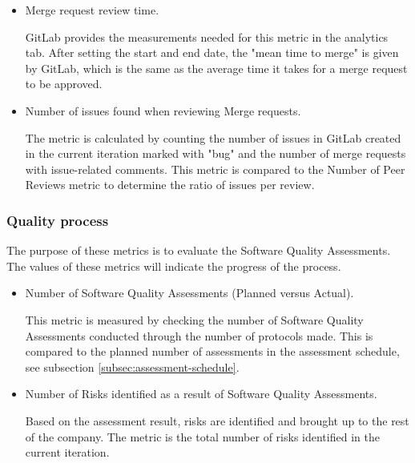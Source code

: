\begin{itemize}
    \item Merge request review time.
    
    GitLab provides the measurements needed for this metric in the analytics tab. After setting the start and end date, the "mean time to merge" is given by GitLab, which is the same as the average time it takes for a merge request to be approved. 
    
    \item Number of issues found when reviewing Merge requests.
    
    The metric is calculated by counting the number of issues in GitLab created in the current iteration marked with "bug" and the number of merge requests with issue-related comments. This metric is compared to the Number of Peer Reviews metric to determine the ratio of issues per review.
\end{itemize}


\subsubsection{Quality process}
The purpose of these metrics is to evaluate the Software Quality Assessments. The values of these metrics will indicate the progress of the process.

\begin{itemize}    
    \item Number of Software Quality Assessments (Planned versus Actual).
    
    This metric is measured by checking the number of Software Quality Assessments conducted through the number of protocols made. This is compared to the planned number of assessments in the assessment schedule, see subsection \ref{subsec:assessment-schedule}. 
     
    \item Number of Risks identified as a result of Software Quality Assessments.
    
    Based on the assessment result, risks are identified and brought up to the rest of the company. The metric is the total number of risks identified in the current iteration.
\end{itemize}

